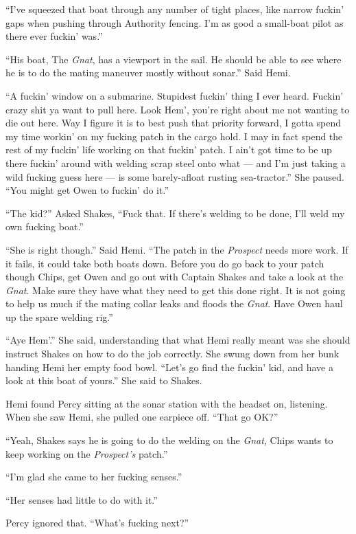 \documentclass[
]{scrbook}
\begin{document}
``I've squeezed that boat through any number of tight places, like
narrow fuckin' gaps when pushing through Authority fencing. I'm as good
a small-boat pilot as there ever fuckin' was.''

``His boat, The \emph{Gnat}, has a viewport in the sail. He should be
able to see where he is to do the mating maneuver mostly without
sonar.'' Said Hemi.

``A fuckin' window on a submarine. Stupidest fuckin' thing I ever heard.
Fuckin' crazy shit ya want to pull here. Look Hem', you're right about
me not wanting to die out here. Way I figure it is to best push that
priority forward, I gotta spend my time workin' on my fucking patch in
the cargo hold. I may in fact spend the rest of my fuckin' life working
on that fuckin' patch. I ain't got time to be up there fuckin' around
with welding scrap steel onto what --- and I'm just taking a wild
fucking guess here --- is some barely-afloat rusting sea-tractor.'' She
paused. ``You might get Owen to fuckin' do it.''

``The kid?'' Asked Shakes, ``Fuck that. If there's welding to be done,
I'll weld my own fucking boat.''

``She is right though.'' Said Hemi. ``The patch in the \emph{Prospect}
needs more work. If it fails, it could take both boats down. Before you
do go back to your patch though Chips, get Owen and go out with Captain
Shakes and take a look at the \emph{Gnat}. Make sure they have what they
need to get this done right. It is not going to help us much if the
mating collar leaks and floods the \emph{Gnat}. Have Owen haul up the
spare welding rig.''

``Aye Hem'.'' She said, understanding that what Hemi really meant was
she should instruct Shakes on how to do the job correctly. She swung
down from her bunk handing Hemi her empty food bowl. ``Let's go find the
fuckin' kid, and have a look at this boat of yours.'' She said to
Shakes.

Hemi found Percy sitting at the sonar station with the headset on,
listening. When she saw Hemi, she pulled one earpiece off. ``That go
OK?''

``Yeah, Shakes says he is going to do the welding on the \emph{Gnat},
Chips wants to keep working on the \emph{Prospect's} patch.''

``I'm glad she came to her fucking senses.''

``Her senses had little to do with it.''

Percy ignored that. ``What's fucking next?''
\end{document}
